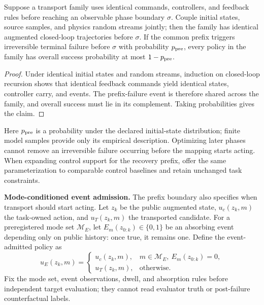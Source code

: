 \begin{proposition}
Suppose a transport family uses identical commands, controllers, and feedback rules before reaching
an observable phase boundary $\sigma$. Couple initial states, source samples, and physics random streams jointly;
then the family has identical augmented closed-loop trajectories before
$\sigma$. If the common prefix triggers irreversible terminal failure before $\sigma$
with probability $p_{\rm pre}$, every policy in the family has overall success probability
at most $1-p_{\rm pre}$.
\end{proposition}
\begin{proof}
Under identical initial states and random streams, induction on closed-loop recursion shows that identical feedback commands yield identical states,
controller carry, and events. The prefix-failure event is therefore shared across the family, and overall success must
lie in its complement. Taking probabilities gives the claim.
\end{proof}
Here $p_{\rm pre}$ is a probability under the declared initial-state distribution; finite model samples provide only its empirical
description. Optimizing later phases cannot remove an irreversible failure occurring before the mapping starts acting.
When expanding control support for the recovery prefix, offer the same parameterization to comparable control baselines
and retain unchanged task constraints.

\textbf{Mode-conditioned event admission.} The prefix boundary also specifies when transport should start
acting. Let $z_k$ be the public augmented state, $u_c(z_k,m)$ the task-owned action,
and $u_T(z_k,m)$ the transported candidate. For a preregistered mode set
$\mathcal M_E$, let $E_m(z_{0:k})\in\{0,1\}$ be an absorbing event depending only on public history:
once true, it remains one. Define the event-admitted policy as
\begin{equation}
 u_E(z_k,m)=
 \begin{cases}
  u_c(z_k,m), & m\in\mathcal M_E,\ E_m(z_{0:k})=0,\\
  u_T(z_k,m), & \text{otherwise}.
 \end{cases}
 \label{eq:event-admitted-transport}
\end{equation}
Fix the mode set, event observations, dwell, and absorption rules before independent target evaluation;
they cannot read evaluator truth or post-failure counterfactual labels.

